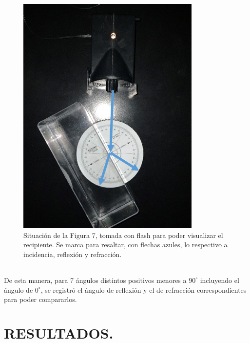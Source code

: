 \documentclass[12pt,a4paper]{article}
\begin{document}
\begin{figure}[ht]
\begin{minipage}{0.45\linewidth}
		\includegraphics[width= 0.9 \linewidth]{IMAGENES/METODOLOGÍA/image_4}
		\caption{Situación de la Figura 7, tomada con flash para poder visualizar el recipiente. Se marca para resaltar, con flechas azules, lo respectivo a incidencia, reflexión y refracción.}
		\label{fig:flash}
	\end{minipage}
\end{figure}\\
De esta manera, para 7 ángulos distintos positivos menores a \(90^ \circ\) incluyendo el ángulo de \(0 ^ \circ\), se registró el ángulo de reflexión y el de refracción correspondientes para poder compararlos. \\[2mm]


\section{RESULTADOS.} %
\end{document}
